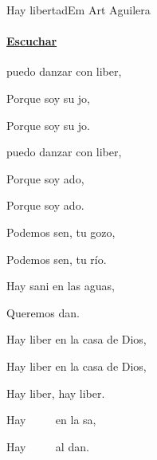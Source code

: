 \documentclass[12pt, spanish]{book}
\begin{document}
    \begin{song}{Hay libertad}{Em}
    {} %
    {Art Aguilera}
    {} %
    {}
        \ifChordBk
        \paragraph{\mbox{}\hfill\protect\href{https://open.spotify.com/intl-es/track/4nxxZtSpkS3tEmuYxNMPmr}{Escuchar}\mbox{}\hfill}
        \fi

        \begin{SBOpGroup}
             puedo danzar con liber,

            Porque soy su jo,

            Porque soy su jo.
        \end{SBOpGroup}

        \begin{SBOpGroup}
             puedo danzar con liber,

            Porque soy ado,

            Porque soy ado.
        \end{SBOpGroup}


        \begin{SBOpGroup}
            Podemos sen, tu gozo,

            Podemos sen, tu río.

            Hay sani en las aguas,

            Queremos dan.    
        \end{SBOpGroup}

        \begin{SBChorus}
            Hay liber en la casa de Dios,

            Hay liber en la casa de Dios,

            Hay liber, hay liber.
        \end{SBChorus}

        \begin{SBOpGroup}
            Hay ~~~~ en la sa,

            Hay ~~~~ al dan.
        \end{SBOpGroup}



\end{song}
\end{document}
